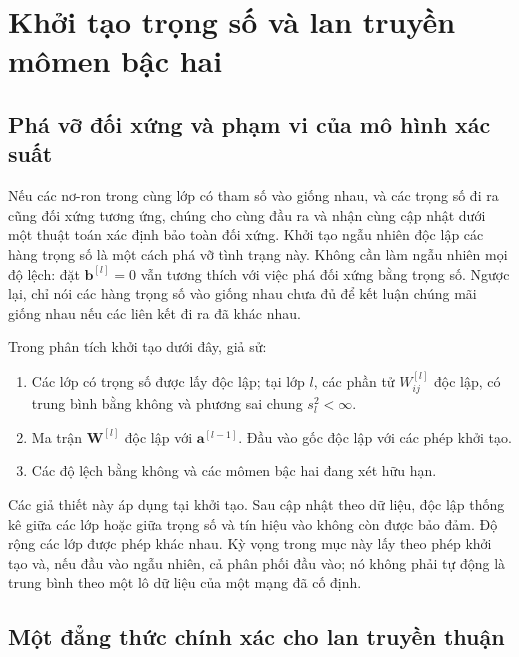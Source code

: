 \section{Khởi tạo trọng số và lan truyền mômen bậc hai}
\label{kt:sec:initialization}

\subsection{Phá vỡ đối xứng và phạm vi của mô hình xác suất}

Nếu các nơ-ron trong cùng lớp có tham số vào giống nhau, và các
trọng số đi ra cũng đối xứng tương ứng, chúng cho cùng đầu ra và
nhận cùng cập nhật dưới một thuật toán xác định bảo toàn đối xứng.
Khởi tạo ngẫu nhiên độc lập các hàng trọng số là một cách phá vỡ
tình trạng này. Không cần làm ngẫu nhiên mọi độ lệch: đặt
$\mathbf b^{[l]}=0$ vẫn tương thích với việc phá đối xứng bằng trọng
số. Ngược lại, chỉ nói các hàng trọng số vào giống nhau chưa đủ
để kết luận chúng mãi giống nhau nếu các liên kết đi ra đã khác nhau.

Trong phân tích khởi tạo dưới đây, giả sử:
\begin{enumerate}[label=\textnormal{(K\arabic*)},leftmargin=*]
 \item Các lớp có trọng số được lấy độc lập; tại lớp $l$, các phần
 tử $W_{ij}^{[l]}$ độc lập, có trung bình bằng không và phương sai
 chung $s_l^2<\infty$.
 \item Ma trận $\mathbf W^{[l]}$ độc lập với
 $\mathbf a^{[l-1]}$. Đầu vào gốc độc lập với các phép khởi tạo.
 \item Các độ lệch bằng không và các mômen bậc hai đang xét hữu hạn.
\end{enumerate}
Các giả thiết này áp dụng tại khởi tạo. Sau cập nhật theo dữ liệu,
độc lập thống kê giữa các lớp hoặc giữa trọng số và tín hiệu vào
không còn được bảo đảm. Độ rộng các lớp được phép khác nhau.
Kỳ vọng trong mục này lấy theo phép khởi tạo và, nếu đầu vào ngẫu
nhiên, cả phân phối đầu vào; nó không phải tự động là trung bình
theo một lô dữ liệu của một mạng đã cố định.

\subsection{Một đẳng thức chính xác cho lan truyền thuận}

